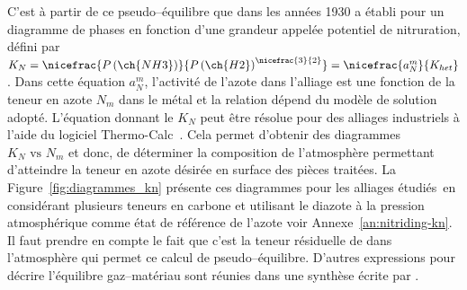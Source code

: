 C'est à partir de ce pseudo--équilibre que \citet{Lehrer1930} dans les années 1930 a établi pour  un diagramme de phases en fonction d'une grandeur appelée potentiel de nitruration, défini par $K_{N}=\nicefrac{P\left(\ch{NH3}\right)}{P\left(\ch{H2}\right)^{\nicefrac{3}{2}}}= \nicefrac{a_{N}^{m}}{K_{het}}$. Dans cette équation $a_{N}^{m}$, l'activité de l'azote dans l'alliage est une fonction de la teneur en azote $N_{m}$ dans le métal et la relation dépend du modèle de solution adopté. L'équation donnant le $K_{N}$ peut être résolue pour des alliages industriels à l'aide du logiciel Thermo-Calc~\cite{Andersson2002,Borgenstam2000}. Cela permet d'obtenir des diagrammes $K_{N}\text{ vs }N_{m}$ et donc, de déterminer la composition de l'atmosphère permettant d'atteindre la teneur en azote désirée en surface des pièces traitées. La Figure~\ref{fig:diagrammes_kn} présente ces diagrammes pour les alliages étudiés en considérant plusieurs teneurs en carbone et utilisant le diazote à la pression atmosphérique comme état de référence de l'azote \textemdash{} voir Annexe~\ref{an:nitriding-kn}. Il faut prendre en compte le fait que c'est la teneur résiduelle de  dans l'atmosphère qui permet ce calcul de pseudo--équilibre. D'autres expressions pour décrire l'équilibre gaz--matériau
sont réunies dans une synthèse écrite par \citet{Gantois2010}.

